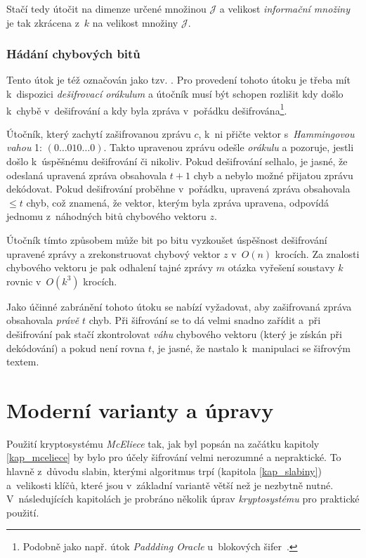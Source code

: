 \documentclass[thesis=M,czech,hidelinks]{FITthesis}[2012/06/26]
\newcommand{\0}{{\textcolor[gray]{0.80}{0}}}
\begin{document}
Stačí tedy útočit na dimenze určené množinou $\mathcal{J}$ a velikost
\emph{informační množiny} je tak zkrácena z~$k$ na velikost množiny
$\mathcal{J}$.


\subsubsection{Hádání chybových bitů}

Tento útok je též označován jako tzv. . Pro provedení tohoto
útoku je třeba mít k~dispozici \emph{dešifrovací orákulum} a útočník musí být
schopen rozlišit kdy došlo k~chybě v~dešifrování a kdy byla zpráva v~pořádku
dešifrována\footnote{
    Podobně jako např. útok \emph{Paddding Oracle} u~blokových
    šifer~\cite{FIT_KRY}.
}.

Útočník, který zachytí zašifrovanou zprávu $c$, k~ni přičte vektor
s~\emph{Hammingovou vahou} 1: $\left(0\ldots010\ldots0\right)$. Takto upravenou
zprávu odešle \emph{orákulu} a pozoruje, jestli došlo k~úspěšnému dešifrování či
nikoliv. Pokud dešifrování selhalo, je jasné, že odeslaná upravená zpráva
obsahovala $t+1$ chyb a nebylo možné přijatou zprávu dekódovat. Pokud
dešifrování proběhne v~pořádku, upravená zpráva obsahovala $\leq t$ chyb, což
znamená, že vektor, kterým byla zpráva upravena, odpovídá jednomu z~náhodných
bitů chybového vektoru $z$.

Útočník tímto způsobem může bit po bitu vyzkoušet úspěšnost dešifrování upravené
zprávy a zrekonstruovat chybový vektor $z$ v~$O\left( n \right)$ krocích. Za
znalosti chybového vektoru je pak odhalení tajné zprávy $m$ otázka vyřešení
soustavy $k$ rovnic v~$O\left( k^3 \right)$ krocích.

Jako účinné zabránění tohoto útoku se nabízí vyžadovat, aby zašifrovaná zpráva
obsahovala \emph{právě} $t$ chyb. Při šifrování se to dá velmi snadno zařídit
a~při dešifrování pak stačí zkontrolovat \emph{váhu} chybového vektoru (který je
získán při dekódování) a pokud není rovna $t$, je jasné, že nastalo k~manipulaci
se šifrovým textem.



\section{Moderní varianty a úpravy}

Použití kryptosystému \emph{McEliece} tak, jak byl popsán na začátku kapitoly
\ref{kap_mceliece} by bylo pro účely šifrování velmi nerozumné a nepraktické. To
hlavně z~důvodu slabin, kterými algoritmus trpí (kapitola \ref{kap_slabiny})
a~velikosti klíčů, které jsou v~základní variantě větší než je nezbytně nutné.
V~následujících kapitolách je probráno několik úprav \emph{kryptosystému} pro
praktické použití.
\end{document}
